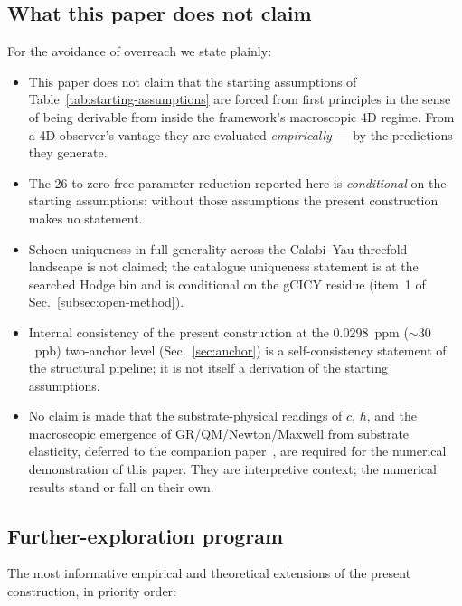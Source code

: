 ﻿\documentclass[reprint,amsmath,amssymb,aps,prd,longbibliography,floatfix]{revtex4-2}
\begin{document}
\subsection{What this paper does not claim}
\label{subsec:not-claimed}

For the avoidance of overreach we state plainly:

\begin{itemize}
\item This paper does not claim that the starting assumptions of
Table~\ref{tab:starting-assumptions} are forced from first principles
in the sense of being derivable from inside the framework's
macroscopic 4D regime. From a 4D observer's vantage they are evaluated
\emph{empirically} --- by the predictions they generate.

\item The 26-to-zero-free-parameter reduction reported here is
\emph{conditional} on the starting assumptions; without those
assumptions the present construction makes no statement.

\item Schoen uniqueness in full generality across the Calabi--Yau
threefold landscape is not claimed; the catalogue uniqueness
statement is at the searched Hodge bin and is conditional on the
gCICY residue (item~1 of Sec.~\ref{subsec:open-method}).

\item Internal consistency of the present construction at the
\SI{0.0298}{ppm} ($\sim 30$~ppb) two-anchor level
(Sec.~\ref{sec:anchor}) is a self-consistency statement of the
structural pipeline; it is not itself a derivation of the starting
assumptions.

\item No claim is made that the substrate-physical readings of $c$,
$\hbar$, and the macroscopic emergence of GR/QM/Newton/Maxwell from
substrate elasticity, deferred to the companion
paper~\cite{UnreasonableEffectiveness}, are required for the
numerical demonstration of this paper. They are interpretive context;
the numerical results stand or fall on their own.
\end{itemize}

\subsection{Further-exploration program}
\label{subsec:further-exploration}

The most informative empirical and theoretical extensions of the
present construction, in priority order:
\end{document}
